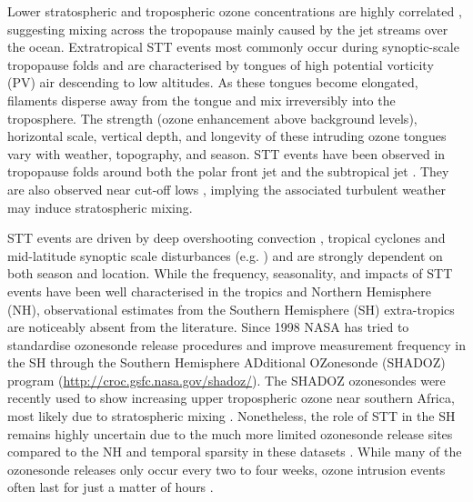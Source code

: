 \documentclass{article}
\begin{document}
    Lower stratospheric and tropospheric ozone concentrations are highly correlated \citep{Terao2008}, suggesting mixing across the tropopause mainly caused by the jet streams over the ocean.
    Extratropical STT events most commonly occur during synoptic-scale tropopause folds \citep{Sprenger2003, Tang2012, Frey2015} and are characterised by tongues of high potential vorticity (PV) air descending to low altitudes.
    As these tongues become elongated, filaments disperse away from the tongue and mix irreversibly into the troposphere.
    The strength (ozone enhancement above background levels), horizontal scale, vertical depth, and longevity of these intruding ozone tongues vary with weather, topography, and season.
    STT events have been observed in tropopause folds around both the polar front jet \citep{Vaughan1994, Beekmann1997} and the subtropical jet \citep{Baray2000}.
    They are also observed near cut-off lows \citep{Price1993, Wirth1995}, implying the associated turbulent weather may induce stratospheric mixing.
    
    STT events are driven by deep overshooting convection \citep{Frey2015}, tropical cyclones \citep{Das2016} and mid-latitude synoptic scale disturbances (e.g. \citet{Stohl2003, Mihalikova2012}) and are strongly dependent on both season and location. 
    While the frequency, seasonality, and impacts of STT events have been well characterised in the tropics and Northern Hemisphere (NH), observational estimates from the Southern Hemisphere (SH) extra-tropics are noticeably absent from the literature. 
    Since 1998 NASA has tried to standardise ozonesonde release procedures and improve measurement frequency in the SH through the Southern Hemisphere ADditional OZonesonde (SHADOZ) program (\url{http://croc.gsfc.nasa.gov/shadoz/}).
    The SHADOZ ozonesondes were recently used to show increasing upper tropospheric ozone near southern Africa, most likely due to stratospheric mixing \citep{Liu2015, Thompson2014}. 
    Nonetheless, the role of STT in the SH remains highly uncertain due to the much more limited ozonesonde release sites compared to the NH and temporal sparsity in these datasets  \citep{Liu2015, Thompson2014, Mze2010}. 
    While many of the ozonesonde releases only occur every two to four weeks, ozone intrusion events often last for just a matter of hours \citep{Tang2012}.
    
  
\end{document}
